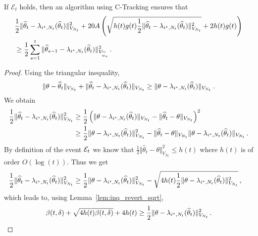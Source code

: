 \begin{lemma}\label{lem:nc_proof_to_online_formulation}
If $\mathcal E_t$ holds, then an algorithm using C-Tracking ensures that
\begin{align*}
    &\frac{1}{2}\Vert \widehat{\theta}_t - \lambda_{i^\star,N_t}(\widehat{\theta}_t) \Vert_{V_{N_t}}^2 + 20 A\left(\sqrt{h(t)g(t) \frac{1}{2}\Vert \widehat{\theta}_t - \lambda_{i^\star,N_t}(\widehat{\theta}_t) \Vert_{V_{N_t}}^2}+ 2h(t)g(t)\right)\\
    &\geq \frac{1}{2}\sum_{s=1}^t \Vert \widehat{\theta}_{s-1} - \lambda_{i^\star,N_t}(\widehat{\theta}_t)\Vert_{V_{\widetilde{w}_s}}^2\,.
\end{align*}
\end{lemma}
\begin{proof}

Using the triangular inequality,
\begin{align*}
\Vert \theta - \widehat{\theta}_t \Vert_{V_{N_t}} + \Vert \widehat{\theta}_t - \lambda_{i^\star,N_t}(\widehat{\theta}_t) \Vert_{V_{N_t}}
\ge \Vert \theta - \lambda_{i^\star,N_t}(\widehat{\theta}_t) \Vert_{V_{N_t}}
\: .
\end{align*}
We obtain
\begin{align*}
\frac{1}{2}\Vert \widehat{\theta}_t - \lambda_{i^\star,N_t}(\widehat{\theta}_t) \Vert_{V_{N_t}}^2
&\ge \frac{1}{2} \left(\Vert \theta - \lambda_{i^\star,N_t}(\widehat{\theta}_t) \Vert_{V_{N_t}} -\Vert \widehat{\theta}_t -\theta \Vert_{V_{N_t}} \right)^2
\\
&\ge \frac{1}{2}\Vert \theta - \lambda_{i^\star,N_t}(\widehat{\theta}_t) \Vert_{V_{N_t}}^2
	-  \Vert \widehat{\theta}_t -\theta \Vert_{V_{N_t}} \Vert \theta - \lambda_{i^\star,N_t}(\widehat{\theta}_t) \Vert_{V_{N_t}}
\,.
\end{align*}
By definition of the event $\mathcal{E}_t$ we know that $\frac{1}{2}\Vert \hat{\theta}_t -\theta \Vert_{V_{N_t}}^2 \leq h(t)$ where $h(t)$ is of order $O(\log(t))$. Thus we get
\begin{align*}
\frac{1}{2}\Vert \widehat{\theta}_t - \lambda_{i^\star,N_t}(\widehat{\theta}_t) \Vert_{V_{N_t}}^2 &\ge \frac{1}{2} \Vert \theta - \lambda_{i^\star,N_t}(\widehat{\theta}_t) \Vert_{V_{N_t}}^2 - \sqrt{4 h(t) \frac{1}{2}\Vert \theta - \lambda_{i^\star,N_t}(\widehat{\theta}_t) \Vert_{V_{N_t}}^2}\,,
\end{align*}
which leads to, using Lemma~\ref{lem:inq_revert_sqrt},
\begin{equation}
\label{eq:to_theta_nc}
\beta(t,\delta) + \sqrt{4 h(t) \beta(t,\delta)} +4h(t) \geq \frac{1}{2} \Vert \theta - \lambda_{\istar,N_t}(\hat{\theta}_t) \Vert_{V_{N_t}}^2 \,.

\end{equation}
\end{proof}
